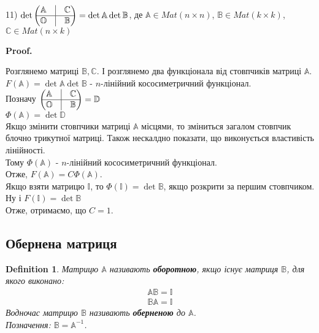 \documentclass[a4paper, 10pt]{article}
\makeatletter
\def\qed{$\blacksquare$}
\theoremstyle{theoremdd}
\theoremstyle{theoremdd}
\newtheorem{definition}[theorem]{Definition}
\theoremstyle{theoremdd}
\theoremstyle{theoremdd}
\theoremstyle{theoremdd}
\theoremstyle{theoremdd}
\theoremstyle{theoremdd}
\theoremstyle{theoremdd}
\renewenvironment{proof}[1][Proof.\\]{\par
\pushQED{\hfill \qed}%
\normalfont \topsep6\p@\@plus6\p@\relax
\trivlist
\item\relax
{\bfseries
#1\@addpunct{.}}\hspace\labelsep\ignorespaces
}{%
\popQED\endtrivlist\@endpefalse
}
\makeatother
\begin{document}
11) $\det \begin{pmatrix}
 \mathbb{A} & \vline & \mathbb{C} \\
 \hline
 \mathbb{O} & \vline & \mathbb{B}
\end{pmatrix} = \det \mathbb{A} \det \mathbb{B}$, де $\mathbb{A} \in Mat(n \times n)$, $\mathbb{B} \in Mat(k \times k)$, $\mathbb{C} \in Mat(n \times k)$
\begin{proof}
Розглянемо матриці $\mathbb{B}, \mathbb{C}$. І розглянемо два функціонала від стовпчиків матриці $\mathbb{A}$.\\
$F(\mathbb{A}) = \det \mathbb{A} \det \mathbb{B}$ - $n$-лінійний кососиметричний функціонал.\\
Позначу $\begin{pmatrix}
 \mathbb{A} & \vline & \mathbb{C} \\
 \hline
 \mathbb{O} & \vline & \mathbb{B}
\end{pmatrix} = \mathbb{D}$\\
$\Phi(\mathbb{A}) = \det \mathbb{D}$\\
Якщо змінити стовпчики матриці $\mathbb{A}$ місцями, то зміниться загалом стовпчик блочно трикутної матриці. Також нескалдно показати, що виконується властивість лінійності.\\
Тому $\Phi(\mathbb{A})$ - $n$-лінійний кососиметричний функціонал.\\
Отже, $F(\mathbb{A}) = C\Phi(\mathbb{A})$.\\
Якщо взяти матрицю $\mathbb{I}$, то $\Phi(\mathbb{I}) = \det \mathbb{B}$, якщо розкрити за першим стовпчиком. Ну і $F(\mathbb{I}) = \det \mathbb{B}$\\
Отже, отримаємо, що $C = 1$.
\end{proof}

\subsection{Обернена матриця}
\begin{definition}
Матрицю $\mathbb{A}$ називають \textbf{оборотною}, якщо існує матриця $\mathbb{B}$, для якого виконано:
\begin{align*}
\mathbb{A} \mathbb{B} = \mathbb{I} \\
\mathbb{B} \mathbb{A} = \mathbb{I}
\end{align*}
Водночас матрицю $\mathbb{B}$ називають \textbf{оберненою} до $\mathbb{A}$.\\
Позначення: $\mathbb{B} = \mathbb{A}^{-1}$.
\end{definition}
\end{document}

